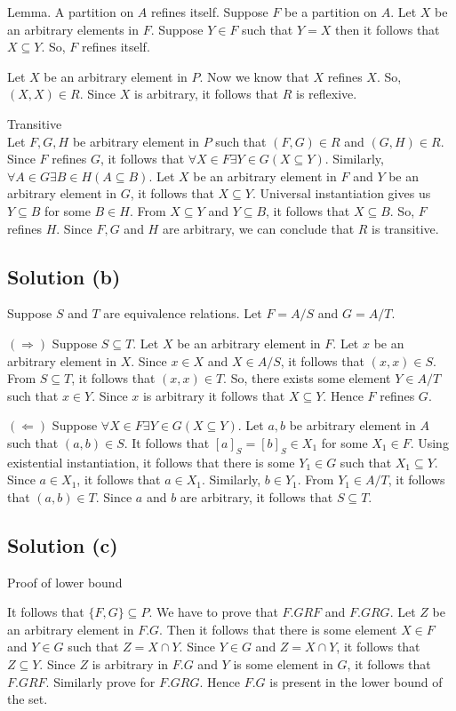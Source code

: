 \documentclass{article}
\begin{document}
Lemma. A partition on $A$ refines itself.
Suppose $F$ be a partition on $A$. Let $X$ be an arbitrary elements in
$F$. Suppose $Y \in F$ such that $Y = X$ then it follows that $X
\subseteq Y$. So, $F$ refines itself.

Let $X$ be an arbitrary element in $P$. Now we know that $X$ refines
$X$. So, $(X,X) \in R$. Since $X$ is arbitrary, it follows that $R$ is
reflexive.

Transitive \\
Let $F,G,H$ be arbitrary element in $P$ such that $(F,G) \in R$ and
$(G,H) \in R$. Since $F$ refines $G$, it follows that $\forall X \in F
\exists Y \in G(X \subseteq Y)$. Similarly, $\forall A \in G \exists B
\in H(A \subseteq B)$. Let $X$ be an arbitrary element in $F$ and $Y$
be an arbitrary element in $G$, it follows that $X \subseteq Y$.
Universal instantiation gives us $Y \subseteq B$ for some $B \in H$.
From $X \subseteq Y$ and $Y \subseteq B$, it follows that $X \subseteq
B$. So, $F$ refines $H$. Since $F,G$ and $H$ are arbitrary, we can
conclude that $R$ is transitive.

\subsection{Solution (b)}
Suppose $S$ and $T$ are equivalence relations. Let $F=A/S$ and
$G=A/T$.

$(\Rightarrow)$ Suppose $S \subseteq T$. Let $X$ be an arbitrary
element in $F$. Let $x$ be an arbitrary element in $X$. Since $x \in
X$ and $X \in A/S$, it follows that $(x,x) \in S$. From $S \subseteq
T$, it follows that $(x,x) \in T$. So, there exists some element $Y
\in A/T$ such that $x \in Y$. Since $x$ is arbitrary it follows that
$X \subseteq Y$. Hence $F$ refines $G$.

$(\Leftarrow)$ Suppose $\forall X \in F \exists Y \in G(X \subseteq
Y)$. Let $a,b$ be arbitrary element in $A$ such that $(a,b) \in S$. It
follows that $[a]_S = [b]_S \in X_1$ for some $X_1 \in F$. Using
existential instantiation, it follows that there is some $Y_1 \in G$
such that $X_1 \subseteq Y$. Since $a \in X_1$, it follows that $a \in
X_1$. Similarly, $b \in Y_1$. From $Y_1 \in A/T$, it follows that
$(a,b) \in T$. Since $a$ and $b$ are arbitrary, it follows that $S
\subseteq T$.

\subsection{Solution (c)}
Proof of lower bound

It follows that $\{F,G\} \subseteq P$. We have to prove that $F.G R F$
and $F.GRG$. Let $Z$ be an arbitrary element in $F.G$. Then it follows
that there is some element $X \in F$ and $Y \in G$ such that $Z = X
\cap Y$. Since $Y \in G$ and $Z = X \cap Y$, it follows that $Z
\subseteq Y$. Since $Z$ is arbitrary in $F.G$ and $Y$ is some element
in $G$, it follows that $F.G R F$. Similarly prove for $F.G R G$.
Hence $F.G$ is present in the lower bound of the set.
\end{document}
